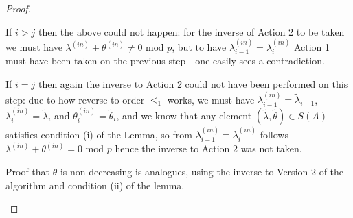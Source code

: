 \documentclass[10pt,a4paper]{amsart}
\begin{document}
\begin{proof}
\begin{itemize}
        If $i>j$ then the above could not happen: for the inverse of Action 2 to be taken we must have $\lambda^{(in)} + \theta^{(in)} \ne 0\text{ mod }p$, but to have $\lambda^{(in)}_{i-1}=\lambda^{(in)}_{i}$ Action 1 must have been taken on the previous step  - one easily sees a contradiction.

        If $i=j$  then again the inverse to Action 2 could not have been performed on this step: due to how reverse to order $<_1$ works, we must have $\lambda^{(in)}_{i-1}=\tilde\lambda_{i-1} $, $\lambda^{(in)}_{i}= \tilde\lambda_{i}$ and $\theta^{(in)}_{i}= \tilde\theta_{i}$, and we know that any element $(\tilde\lambda,\tilde\theta)\in S(A)$ satisfies condition (i) of the Lemma, so from $\lambda^{(in)}_{i-1}=\lambda^{(in)}_{i}$ follows $\lambda^{(in)} + \theta^{(in)} = 0\text{ mod }p$ hence the inverse to Action 2 was not taken.

        Proof that $\theta$ is non-decreasing is analogues, using the inverse to Version 2 of the algorithm and condition (ii) of the lemma.

    \end{itemize}
\end{proof}
\end{document}
